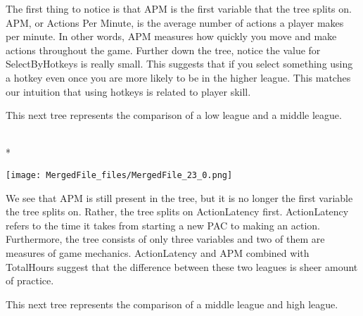\documentclass[letterpaper,10pt,english]{/usr/share/sphinx/texinputs/sphinxhowto}
\def\smaller{\fontsize{9.5pt}{9.5pt}\selectfont}
\newenvironment{InvisibleVerbatim}
        {\begin{mdframed}[leftmargin=0.1\linewidth,innerleftmargin=3pt,innerrightmargin=3pt, userdefinedwidth=1\linewidth, linewidth=0pt, linecolor=white, usetwoside=false]}
        {\end{mdframed}}
\begin{document}
The first thing to notice is that APM is the first variable that the
tree splits on. APM, or Actions Per Minute, is the average number of
actions a player makes per minute. In other words, APM measures how
quickly you move and make actions throughout the game. Further down the
tree, notice the value for SelectByHotkeys is really small. This
suggests that if you select something using a hotkey even once you are
more likely to be in the higher league. This matches our intuition that
using hotkeys is related to player skill.

This next tree represents the comparison of a low league and a middle
league.

    

        
        

            
                \makebox[0.1\linewidth]{\smaller\hfill\tt\color{nbframe-out-prompt}Out\hspace{4pt}{[}194{]}:\hspace{4pt}}\\*
                \vspace{-2.55\baselineskip}\begin{InvisibleVerbatim}
                \vspace{-0.5\baselineskip}
    \begin{center}
    \texttt{[image: MergedFile\_files/MergedFile\_23\_0.png]}
    \par
    \end{center}
    
            \end{InvisibleVerbatim}
            
        
    
We see that APM is still present in the tree, but it is no longer the
first variable the tree splits on. Rather, the tree splits on
ActionLatency first. ActionLatency refers to the time it takes from
starting a new PAC to making an action. Furthermore, the tree consists
of only three variables and two of them are measures of game mechanics.
ActionLatency and APM combined with TotalHours suggest that the
difference between these two leagues is sheer amount of practice.

This next tree represents the comparison of a middle league and high
league.
\end{document}
